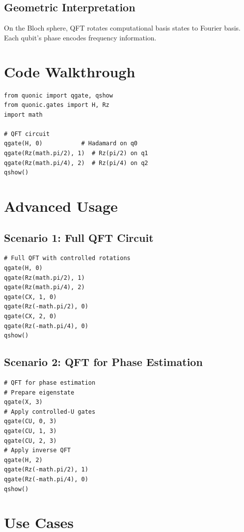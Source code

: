 \documentclass[12pt,a4paper]{article}
\begin{document}
\subsection{Geometric Interpretation}

On the Bloch sphere, QFT rotates computational basis states to Fourier basis. Each qubit's phase encodes frequency information.

\section{Code Walkthrough}

\begin{verbatim}
from quonic import qgate, qshow
from quonic.gates import H, Rz
import math

# QFT circuit
qgate(H, 0)           # Hadamard on q0
qgate(Rz(math.pi/2), 1)  # Rz(pi/2) on q1
qgate(Rz(math.pi/4), 2)  # Rz(pi/4) on q2
qshow()
\end{verbatim}

\section{Advanced Usage}

\subsection{Scenario 1: Full QFT Circuit}

\begin{verbatim}
# Full QFT with controlled rotations
qgate(H, 0)
qgate(Rz(math.pi/2), 1)
qgate(Rz(math.pi/4), 2)
qgate(CX, 1, 0)
qgate(Rz(-math.pi/2), 0)
qgate(CX, 2, 0)
qgate(Rz(-math.pi/4), 0)
qshow()
\end{verbatim}

\subsection{Scenario 2: QFT for Phase Estimation}

\begin{verbatim}
# QFT for phase estimation
# Prepare eigenstate
qgate(X, 3)
# Apply controlled-U gates
qgate(CU, 0, 3)
qgate(CU, 1, 3)
qgate(CU, 2, 3)
# Apply inverse QFT
qgate(H, 2)
qgate(Rz(-math.pi/2), 1)
qgate(Rz(-math.pi/4), 0)
qshow()
\end{verbatim}

\section{Use Cases}
\end{document}
